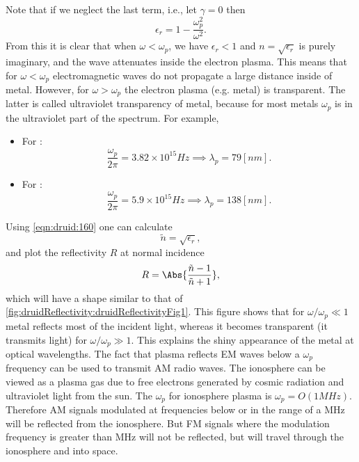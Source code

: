 %
Note that if we neglect the last term, i.e., let \( \gamma = 0 \) then
%
\begin{equation}\label{eqn:druid:160}
\epsilon_r = 1 - \frac{\omega_p^2}{\omega^2}.
\end{equation}
%
From this it is clear that when \( \omega < \omega_p \), we have \( \epsilon_r < 1 \) and \( n = \sqrt{\epsilon_r} \) is purely imaginary, and the wave attenuates inside the electron plasma.
%
This means that for \( \omega < \omega_p \) electromagnetic waves do not propagate a large distance inside of metal.  However, for \( \omega > \omega_p \) the electron plasma (e.g. metal) is transparent.  The latter is called ultraviolet transparency of metal, because for most metals \( \omega_p \) is in the ultraviolet part of the spectrum.  For example,
%
\begin{itemize}
\item For :
\begin{equation}\label{eqn:druid:180}
\frac{\omega_p}{2 \pi} = 3.82 \times 10^{15} \si{Hz} \implies \lambda_p = 79 [nm].
\end{equation}
\item For :
\begin{equation}\label{eqn:druid:200}
\frac{\omega_p}{2 \pi} = 5.9 \times 10^{15} \si{Hz} \implies \lambda_p = 138 [nm].
\end{equation}
\end{itemize}
%
Using \cref{eqn:druid:160} one can calculate
%
\begin{equation}\label{eqn:druid:220}
\tilde{n} = \sqrt{\epsilon_r},
\end{equation}
%
and plot the reflectivity \( R \) at normal incidence
%
\begin{equation}\label{eqn:druid:240}
R = \Abs{ \frac{\tilde{n} - 1 }{\tilde{n} + 1} },
\end{equation}
%
which will have a shape similar to that of \cref{fig:druidReflectivity:druidReflectivityFig1}.
%
%
This figure shows that for \( \omega/\omega_p \ll 1 \) metal reflects most of the incident light, whereas it becomes transparent (it transmits light) for \( \omega/\omega_p \gg 1 \).  This explains the shiny appearance of the metal at optical wavelengths.
%
The fact that plasma reflects EM waves below a \( \omega_p \) frequency can be used to transmit AM radio waves.  The ionosphere can be viewed as a plasma gas due to free electrons generated by cosmic radiation and ultraviolet light from the sun.  The \( \omega_p \) for ionosphere plasma is \( \omega_p = O(1 \si{MHz}) \).  Therefore AM signals modulated at frequencies below or in the range of a \si{MHz} will be reflected from the ionosphere.  But FM signals where the modulation frequency is greater than \si{MHz} will not be reflected, but will travel through the ionosphere and into space.
%
